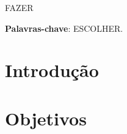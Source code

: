 \documentclass[
	12pt,				%
	oneside,   	        %
	a4paper,			%
	english,			%
	french,				%
	spanish,			%
	brazil,				%
	]{pacotes/abntex2}
\begin{document}
\frenchspacing 



\imprimirfolhaderosto



\begin{resumo}
FAZER
 \vspace{\onelineskip}
    
 \noindent
 \textbf{Palavras-chave}: ESCOLHER.
\end{resumo}




\tableofcontents*
\cleardoublepage

\textual

\makeatletter
\renewcommand{\chapter}{\@gobbletwo}
\makeatother

\section{Introdução}
\label{sec:introducao}

\section{Objetivos}
\label{sec:objetivos}
\end{document}
